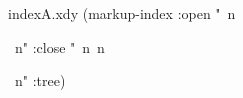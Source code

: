  
 
  
\begin{filecontents*}{indexA.xdy}
(markup-index :open  "~n
\begin{theindex}
  \providecommand*\lettergroupDefault[1]{}
  \providecommand*\lettergroup[1]{%
    \textsf{#1}
    \nopagebreak
  }
  ~n"
  :close "~n~n\end{theindex}~n"
:tree)
\end{filecontents*}

 
